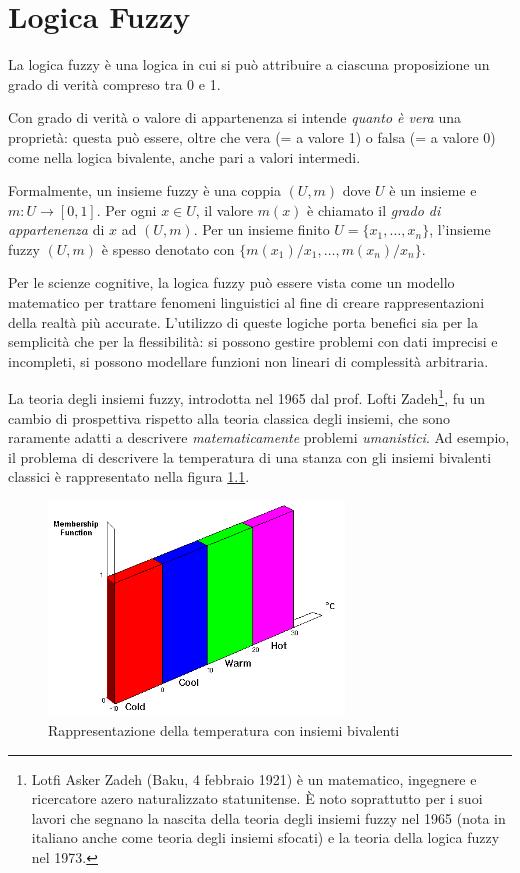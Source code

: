 \chapter{Logica Fuzzy}\label{fuzzy-set}
La logica fuzzy è una logica in cui si può attribuire a ciascuna proposizione un grado di verità compreso tra 0 e 1.

Con grado di verità o valore di appartenenza si intende \emph{quanto è vera} una proprietà: questa può essere, oltre che vera (= a valore 1) o falsa (= a valore 0) come nella logica bivalente, anche pari a valori intermedi.

Formalmente, un insieme fuzzy è una coppia $(U,m)$ dove $U$ è un insieme e $m\colon U \rightarrow [0,1]$. Per ogni $x \in U$, il valore $m(x)$ è chiamato il \emph{grado di appartenenza} di $x$ ad $(U,m)$. Per un insieme finito $U=\{x_1,\dots,x_n\}$, l'insieme fuzzy $(U,m)$ è spesso denotato con $\{m(x_1)/x_1,\dots,m(x_n)/x_n\}$.

Per le scienze cognitive, la logica fuzzy può essere vista come un modello matematico per trattare fenomeni linguistici al fine di creare rappresentazioni della realtà più accurate. L’utilizzo di queste logiche porta benefici sia per la semplicità che per la flessibilità: si possono gestire problemi con dati imprecisi e incompleti, si possono modellare funzioni non lineari di complessità arbitraria.

La teoria degli insiemi fuzzy, introdotta nel 1965 dal prof. Lofti Zadeh\footnote{Lotfi Asker Zadeh (Baku, 4 febbraio 1921) è un matematico, ingegnere e ricercatore azero naturalizzato statunitense. È noto soprattutto per i suoi lavori che segnano la nascita della teoria degli insiemi fuzzy nel 1965 (nota in italiano anche come teoria degli insiemi sfocati) e la teoria della logica fuzzy nel 1973.}, fu un cambio di prospettiva rispetto alla teoria classica degli insiemi, che sono raramente adatti a descrivere \emph{matematicamente} problemi \emph{umanistici}. Ad esempio, il problema di descrivere la temperatura di una stanza con gli insiemi bivalenti classici è rappresentato nella figura \ref{fig:bivalent-sets}.

\begin{figure}[hbt]
  \centering
  \includegraphics[width=0.7\textwidth]{img/fuzzy-bivalent_temp.png}
  \caption{Rappresentazione della temperatura con insiemi bivalenti}
  \label{fig:bivalent-sets}
\end{figure}


